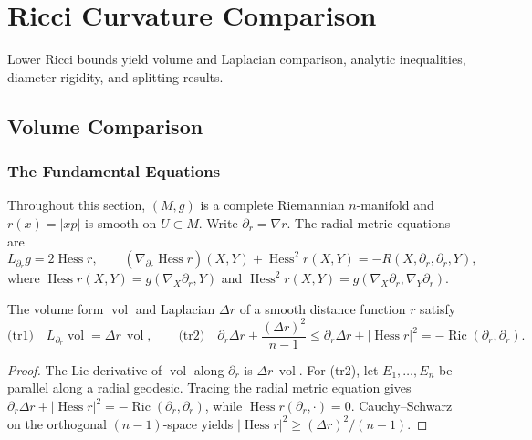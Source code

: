 \chapter{Ricci Curvature Comparison}
\label{chap:pet-ricci-curvature-comparison}

\newcommand{\Ric}{\operatorname{Ric}}
\newcommand{\Hess}{\operatorname{Hess}}
\newcommand{\vol}{\operatorname{vol}}
\newcommand{\diam}{\operatorname{diam}}
\newcommand{\Iso}{\mathrm{Iso}}
\newcommand{\snk}{\mathrm{sn}}

Lower Ricci bounds yield volume and Laplacian comparison, analytic
inequalities, diameter rigidity, and splitting results.

\section{Volume Comparison}

\subsection{The Fundamental Equations}

Throughout this section, $(M,g)$ is a complete Riemannian $n$-manifold and
$r(x)=|xp|$ is smooth on $U\subset M$. Write $\partial_r=\nabla r$. The radial
metric equations are
\[
  L_{\partial_r}g=2\Hess r,
  \qquad
  (\nabla_{\partial_r}\Hess r)(X,Y)+\Hess^2r(X,Y)=-R(X,\partial_r,\partial_r,Y),
\]
where $\Hess r(X,Y)=g(\nabla_X\partial_r,Y)$ and
$\Hess^2r(X,Y)=g(\nabla_X\partial_r,\nabla_Y\partial_r)$.

\begin{proposition}
  \label{prop:pet-ch7-volume-form-laplacian-trace}
  The volume form $\vol$ and Laplacian $\Delta r$ of a smooth distance
  function $r$ satisfy
  \[
    \text{(tr1)}\quad L_{\partial_r}\vol=\Delta r\,\vol,
    \qquad
    \text{(tr2)}\quad \partial_r\Delta r+\frac{(\Delta r)^2}{n-1}
    \le\partial_r\Delta r+|\Hess r|^2=-\Ric(\partial_r,\partial_r).
  \]
\end{proposition}
\begin{proof}
  \sketch
  The Lie derivative of \(\vol\) along \(\partial_r\) is \(\Delta r\,\vol\). For (tr2), let \(E_1,\ldots,E_n\) be parallel along a radial geodesic. Tracing the radial metric equation gives \(\partial_r\Delta r+|\Hess r|^2=-\Ric(\partial_r,\partial_r)\), while \(\Hess r(\partial_r,\cdot)=0\). Cauchy--Schwarz on the orthogonal \((n-1)\)-space yields \(|\Hess r|^2\ge(\Delta r)^2/(n-1)\).
\end{proof}


